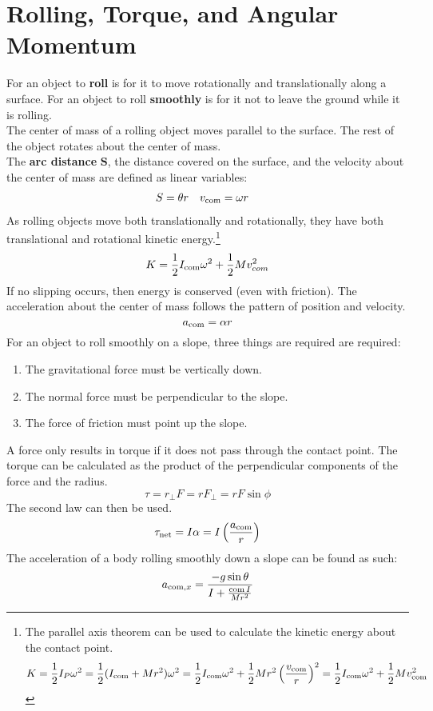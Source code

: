 \documentclass[../AP_Physics_C.tex]{subfiles}
\begin{document}
	\section{Rolling, Torque, and Angular Momentum}
		For an object to \textbf{roll} is for it to move rotationally and translationally along a surface. For an object to roll \textbf{smoothly} is for it not to leave the ground while it is rolling. \\
		The center of mass of a rolling object moves parallel to the surface. The rest of the object rotates about the center of mass. \\
		The \textbf{arc distance} $\bm{S}$, the distance covered on the surface, and the velocity about the center of mass are defined as linear variables:
		\begin{align*}
			S &= \theta r & v_{\operatorname{com}} &= \omega r
		\end{align*}
		As rolling objects move both translationally and rotationally, they have both translational and rotational kinetic energy.\footnote{
			The parallel axis theorem can be used to calculate the kinetic energy about the contact point.
			\[
				K = \frac{1}{2}I_P\omega^2 = \frac{1}{2}(I_{\operatorname{com}} + Mr^2)\omega^2 = \frac{1}{2}I_{\operatorname{com}}\omega^2 + \frac{1}{2}Mr^2\left(\frac{v_{\operatorname{com}}}{r}\right)^2 = \frac{1}{2}I_{\operatorname{com}}\omega^2 + \frac{1}{2}Mv_{\operatorname{com}}^2		
			\]
			}
		\[K = \frac{1}{2}I_{\operatorname{com}}\omega^2 + \frac{1}{2}Mv_{com}^2\]
		If no slipping occurs, then energy is conserved (even with friction).
		The acceleration about the center of mass follows the pattern of position and velocity.
		\[a_{\operatorname{com}} = \alpha r\]
		For an object to roll smoothly on a slope, three things are required are required:
		\begin{enumerate}
			\item
				The gravitational force must be vertically down.
			\item
				The normal force must be perpendicular to the slope.
			\item
				The force of friction must point up the slope.
		\end{enumerate}
		A force only results in torque if it does not pass through the contact point. The torque can be calculated as the product of the perpendicular components of the force and the radius.
		\[\tau = r_\bot F = rF_\bot = rF\sin\phi\]
		The second law can then be used.
		\[\tau_{\operatorname{net}} = I\alpha = I\left(\frac{a_{\operatorname{com}}}{r}\right)\]
		The acceleration of a body rolling smoothly down a slope can be found as such:
		\[a_{\operatorname{com}, x} = \frac{-g\sin\theta}{I + \frac{\operatorname{com}{I}}{Mr^2}}\]
\end{document}
